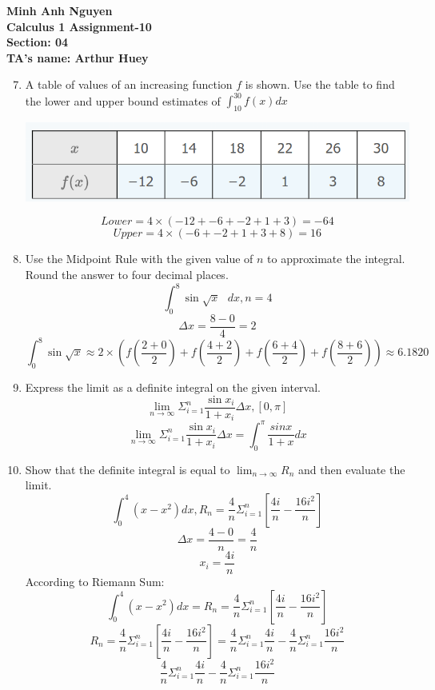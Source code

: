 \documentclass[12pt]{article}
\begin{document}
\textbf{Minh Anh Nguyen }\\
\textbf{Calculus 1 Assignment-10}\\
\textbf{Section: 04}\\
\textbf{TA's name: Arthur Huey}

\hrulefill

\begin{enumerate}
\setcounter{enumi}{6}
    \item A table of values of an increasing function $f$ is shown. Use the table to find the lower and upper bound estimates of $\int_{10}^{30} f(x)dx$
    \begin{center}
        \includegraphics[scale=0.5]{img/img-0.png}
    \end{center}
    \[Lower = 4\times(-12 + -6 + -2 + 1 + 3) = -64\]
    \[Upper = 4\times(-6 + -2 + 1 + 3 + 8) = 16\]
\setcounter{enumi}{10}
    \item Use the Midpoint Rule with the given value of $n$ to approximate the integral. Round the answer to four decimal places.
    \[\int_{0}^{8} \sin \sqrt{x} \text{ } dx, n = 4\]
    \[\Delta x = \frac{8-0}{4} = 2\]
    \[\int_{0}^{8} \sin \sqrt{x} \approx 2 \times (f(\frac{2+0}{2}) + f(\frac{4+2}{2}) + f(\frac{6+4}{2}) + f(\frac{8+6}{2})) \approx 6.1820\]
\setcounter{enumi}{18}
    \item Express the limit as a definite integral on the given interval.
    \[\lim_{n \to \infty} \Sigma_{i=1}^{n} \frac{\sin x_i}{1 + x_i}\Delta x, [0,\pi]\]
    \[\lim_{n \to \infty} \Sigma_{i=1}^{n} \frac{\sin x_i}{1 + x_i}\Delta x = \int_{0}^{\pi} \frac{sin x}{1 + x} dx\]
\setcounter{enumi}{22} 
    \item Show that the definite integral is equal to $\lim_{n \to \infty} R_n$ and then evaluate the limit.
    \[\int_{0}^{4}(x-x^2)dx, R_n = \frac{4}{n} \Sigma_{i = 1}^{n}[\frac{4i}{n} - \frac{16i^2}{n}]\]
    \[\Delta x = \frac{4-0}{n} = \frac{4}{n}\]
    \[x_i = \frac{4i}{n}\]
    According to Riemann Sum:
    \[\int_{0}^{4}(x-x^2)dx = R_n = \frac{4}{n} \Sigma_{i = 1}^{n}[\frac{4i}{n} - \frac{16i^2}{n}]\]
    \[R_n = \frac{4}{n} \Sigma_{i = 1}^{n}[\frac{4i}{n} - \frac{16i^2}{n}] = \frac{4}{n} \Sigma_{i = 1}^{n}\frac{4i}{n} - \frac{4}{n} \Sigma_{i = 1}^{n} \frac{16i^2}{n}\]
    \[\frac{4}{n} \Sigma_{i = 1}^{n}\frac{4i}{n} - \frac{4}{n} \Sigma_{i = 1}^{n} \frac{16i^2}{n}\]
\end{enumerate}
\end{document}
